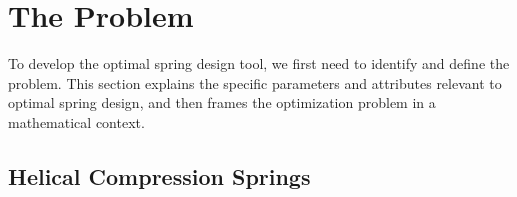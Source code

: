 \documentclass[10pt]{article}
\begin{document}
\section{The Problem} 
\label{sec:The_Problem}

To develop the optimal spring design tool, we first need to identify and define the problem. This section explains the specific parameters and attributes relevant to optimal spring design, and then frames the optimization problem in a mathematical context.

\subsection{Helical Compression Springs}
\label{sec:Springs}
\end{document}
